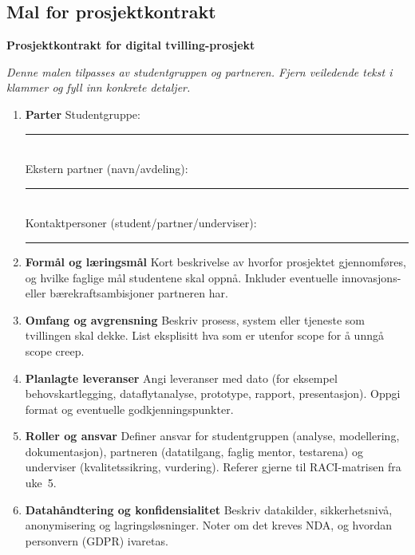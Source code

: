 \subsection*{Mal for prosjektkontrakt}
\noindent\textbf{Prosjektkontrakt for digital tvilling-prosjekt}\par
\noindent\textit{Denne malen tilpasses av studentgruppen og partneren. Fjern veiledende tekst i klammer og fyll inn konkrete detaljer.}

\begin{enumerate}
    \item \textbf{Parter}\newline
    Studentgruppe: \rule{0.6\linewidth}{0.4pt}\\
    Ekstern partner (navn/avdeling): \rule{0.6\linewidth}{0.4pt}\\
    Kontaktpersoner (student/partner/underviser): \rule{0.6\linewidth}{0.4pt}

    \item \textbf{Formål og læringsmål}\newline
    Kort beskrivelse av hvorfor prosjektet gjennomføres, og hvilke faglige mål studentene skal oppnå. Inkluder eventuelle innovasjons- eller bærekraftsambisjoner partneren har.

    \item \textbf{Omfang og avgrensning}\newline
    Beskriv prosess, system eller tjeneste som tvillingen skal dekke. List eksplisitt hva som er utenfor scope for å unngå scope creep.

    \item \textbf{Planlagte leveranser}\newline
    Angi leveranser med dato (for eksempel behovskartlegging, dataflytanalyse, prototype, rapport, presentasjon). Oppgi format og eventuelle godkjenningspunkter.

    \item \textbf{Roller og ansvar}\newline
    Definer ansvar for studentgruppen (analyse, modellering, dokumentasjon), partneren (datatilgang, faglig mentor, testarena) og underviser (kvalitetssikring, vurdering). Referer gjerne til RACI-matrisen fra uke~5.

    \item \textbf{Datahåndtering og konfidensialitet}\newline
    Beskriv datakilder, sikkerhetsnivå, anonymisering og lagringsløsninger. Noter om det kreves NDA, og hvordan personvern (GDPR) ivaretas.


\end{enumerate}
